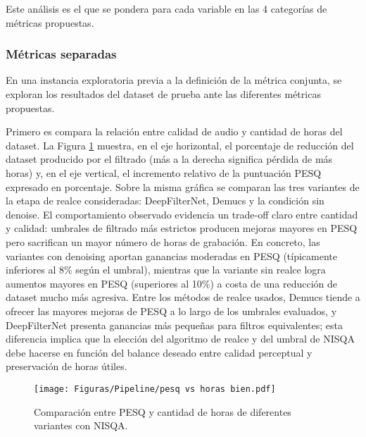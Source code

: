 Este análisis es el que se pondera para cada variable en las 4 categorías de métricas propuestas.

\subsubsection{Métricas separadas}
En una instancia exploratoria previa a la definición de la métrica conjunta, se exploran los resultados del dataset de prueba ante las diferentes métricas propuestas.

Primero es compara la relación entre calidad de audio y cantidad de horas del dataset. La Figura \ref{fig:horas_vs_pesq} muestra, en el eje horizontal, el porcentaje de reducción del dataset producido por el filtrado (más a la derecha significa pérdida de más horas) y, en el eje vertical, el incremento relativo de la puntuación PESQ expresado en porcentaje. Sobre la misma gráfica se comparan las tres variantes de la etapa de realce consideradas: DeepFilterNet, Demucs y la condición sin denoise. El comportamiento observado evidencia un trade-off claro entre cantidad y calidad: umbrales de filtrado más estrictos producen mejoras mayores en PESQ pero sacrifican un mayor número de horas de grabación. En concreto, las variantes con denoising aportan ganancias moderadas en PESQ (típicamente inferiores al 8\% según el umbral), mientras que la variante sin realce logra aumentos mayores en PESQ (superiores al 10\%) a costa de una reducción de dataset mucho más agresiva. Entre los métodos de realce usados, Demucs tiende a ofrecer las mayores mejoras de PESQ a lo largo de los umbrales evaluados, y DeepFilterNet presenta ganancias más pequeñas para filtros equivalentes; esta diferencia implica que la elección del algoritmo de realce y del umbral de NISQA debe hacerse en función del balance deseado entre calidad perceptual y preservación de horas útiles.

\begin{figure}[h]
  \centering
  \centerline{\texttt{[image: Figuras/Pipeline/pesq vs horas bien.pdf]}}
  \caption{Comparación entre PESQ y cantidad de horas de diferentes variantes con NISQA.}
    \label{fig:horas_vs_pesq}
\end{figure}

